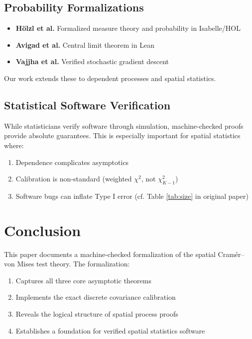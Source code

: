 \documentclass[11pt,a4paper]{article}
\theoremstyle{definition}
\begin{document}
\subsection{Probability Formalizations}

\begin{itemize}
\item \textbf{Hölzl et al.} Formalized measure theory and probability in Isabelle/HOL
\item \textbf{Avigad et al.} Central limit theorem in Lean
\item \textbf{Vajjha et al.} Verified stochastic gradient descent
\end{itemize}

Our work extends these to dependent processes and spatial statistics.

\subsection{Statistical Software Verification}

While statisticians verify software through simulation, machine-checked proofs provide absolute guarantees. This is especially important for spatial statistics where:

\begin{enumerate}
\item Dependence complicates asymptotics
\item Calibration is non-standard (weighted $\chi^2$, not $\chi^2_{K-1}$)
\item Software bugs can inflate Type I error (cf. Table \ref{tab:size} in original paper)
\end{enumerate}

\section{Conclusion}
\label{sec:conclusion}

This paper documents a machine-checked formalization of the spatial Cram\'{e}r--von Mises test theory. The formalization:

\begin{enumerate}
\item Captures all three core asymptotic theorems
\item Implements the exact discrete covariance calibration
\item Reveals the logical structure of spatial process proofs
\item Establishes a foundation for verified spatial statistics software
\end{enumerate}
\end{document}
